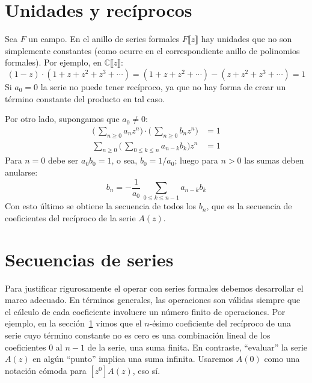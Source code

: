 \section{Unidades y recíprocos}
\label{sec:series:unidades-reciprocos}

  Sea \(F\) un campo.
  En el anillo de series formales \(F \llbracket z \rrbracket\)
  hay unidades que no son simplemente constantes
  (como ocurre en el correspondiente anillo de polinomios formales).
  Por ejemplo,
  en \(\mathbb{C}\llbracket z \rrbracket\):
  \begin{equation*}
    (1 - z) \cdot (1 + z + z^2 + z^3 + \dotsb)
      = (1 + z + z^2 + \dotsb) - (z + z^2 + z^3 + \dotsb)
      = 1
  \end{equation*}
  Si \(a_0 = 0\) la serie no puede tener recíproco,
  ya que no hay forma
  de crear un término constante del producto en tal caso.

  Por otro lado,
  supongamos que \(a_0 \ne 0\):
  \begin{align*}
    \biggl( \, \sum_{n \ge 0} a_n z^n \biggr) \cdot
      \biggl( \, \sum_{n \ge 0} b_n z^n \biggr)
       &= 1 \\
    \sum_{n \ge 0} \biggl( \,
		     \sum_{0 \le k \le n} a_{n -k} b_k
		   \biggr) z^n
       &= 1
  \end{align*}
  Para \(n = 0\) debe ser \(a_0 b_0 = 1\),
  o sea,
  \(b_0 = 1 / a_0\);
  luego para \(n > 0\) las sumas deben anularse:
  \begin{equation*}
    b_n
      = -\frac{1}{a_0} \, \sum_{0 \le k \le n - 1} a_{n - k} b_k
  \end{equation*}
  Con esto último se obtiene la secuencia de todos los \(b_n\),
  que es la secuencia de coeficientes del recíproco de la serie \(A(z)\).

\section{Secuencias de series}
\label{sec:series-secuencias}

  Para justificar rigurosamente el operar con series formales
  debemos desarrollar el marco adecuado.
  En términos generales,
  las operaciones son válidas siempre que el cálculo de cada coeficiente
  involucre un número finito de operaciones.
  Por ejemplo,
  en la sección~\ref{sec:series:unidades-reciprocos}
  vimos que el \(n\)\nobreakdash-ésimo coeficiente
  del recíproco de una serie cuyo término constante no es cero
  es una combinación lineal de los coeficientes \(0\) al \(n - 1\)
  de la serie,
  una suma finita.
  En contraste,
  ``evaluar'' la serie \(A(z)\) en algún ``punto'' implica una suma infinita.
  Usaremos \(A(0)\) como una notación cómoda
  para \(\left[ z^0 \right] A(z)\),
  eso sí.

